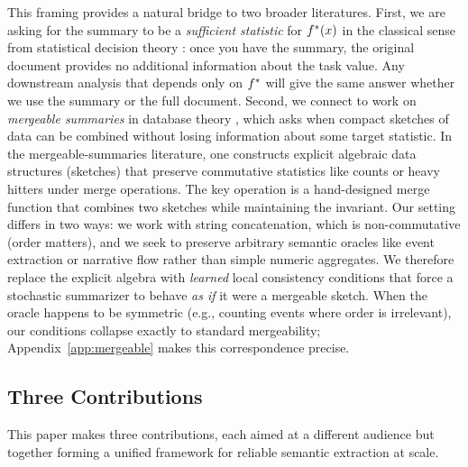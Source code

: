 This framing provides a natural bridge to two broader literatures. First, we are asking for the summary to be a \emph{sufficient statistic} for $f^{\ast}(x)$ in the classical sense from statistical decision theory \citep{Blackwell1953}: once you have the summary, the original document provides no additional information about the task value. Any downstream analysis that depends only on $f^{\ast}$ will give the same answer whether we use the summary or the full document. Second, we connect to work on \emph{mergeable summaries} in database theory \citep{agarwal2013mergeable}, which asks when compact sketches of data can be combined without losing information about some target statistic. In the mergeable-summaries literature, one constructs explicit algebraic data structures (sketches) that preserve commutative statistics like counts or heavy hitters under merge operations. The key operation is a hand-designed merge function that combines two sketches while maintaining the invariant. Our setting differs in two ways: we work with string concatenation, which is non-commutative (order matters), and we seek to preserve arbitrary semantic oracles like event extraction or narrative flow rather than simple numeric aggregates. We therefore replace the explicit algebra with \emph{learned} local consistency conditions that force a stochastic summarizer to behave \emph{as if} it were a mergeable sketch. When the oracle happens to be symmetric (e.g., counting events where order is irrelevant), our conditions collapse exactly to standard mergeability; Appendix~\ref{app:mergeable} makes this correspondence precise.

\subsection{Three Contributions}

This paper makes three contributions, each aimed at a different audience but together forming a unified framework for reliable semantic extraction at scale.

